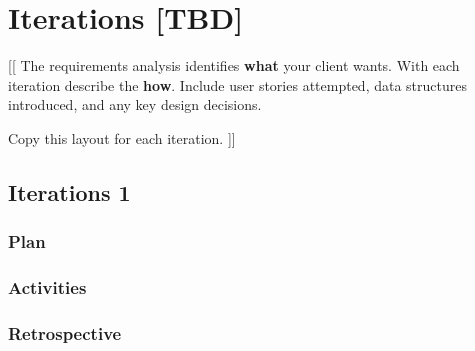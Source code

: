 \section{Iterations \textbf{[TBD]}}

[[ The requirements analysis identifies \textbf{what} your client wants.
With each iteration describe the \textbf{how}.
Include user stories attempted, data structures introduced, and any key design
decisions.

Copy this layout for each iteration. ]]

\subsection{Iterations 1}

\subsubsection{Plan}

\subsubsection{Activities}

\subsubsection{Retrospective}


